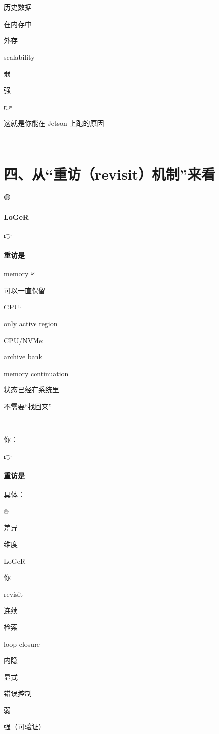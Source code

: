 \documentclass[12pt]{article}
\begin{document}
历史数据

在内存中

外存

scalability

弱

强

👉

这就是你能在 Jetson 上跑的原因

🧠

\section{四、从“重访（revisit）机制”来看}
🟡

\paragraph{LoGeR}
👉

\paragraph{重访是}
memory ≈

可以⼀直保留

GPU:

only active region

CPU/NVMe:

archive bank

memory continuation

状态已经在系统里

不需要“找回来”

🔵

你：

👉

\paragraph{重访是}
具体：

🔥

差异

维度

LoGeR

你

revisit

连续

检索

loop closure

内隐

显式

错误控制

弱

强（可验证）
\end{document}
